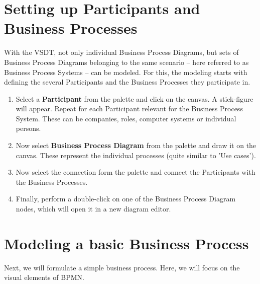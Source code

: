
\section{Setting up Participants and Business Processes}

With the VSDT, not only individual Business Process Diagrams, but sets of Business
Process Diagrams belonging to the same scenario -- here referred to as Business
Process Systems -- can be modeled.  For this, the modeling starts with defining
the several Participants and the Business Processes they participate in.

\begin{enumerate}

	\item Select a \textbf{Participant} from the palette and click on the canvas.
	A stick-figure will appear.  Repeat for each Participant relevant for the
	Business Process System.  These can be companies, roles, computer systems or
	individual persons.
	
	\item Now select \textbf{Business Process Diagram} from the palette and draw
	it on the canvas.  These represent the individual processes (quite similar to
	'Use cases').
	
	\item Now select the connection form the palette and connect the Participants
	with the Business Processes.
	
	\item Finally, perform a double-click on one of the Business Process Diagram
	nodes, which will open it in a new diagram editor.
	
\end{enumerate}



\section{Modeling a basic Business Process}

Next, we will formulate a simple business process.  Here, we will focus on the
visual elements of BPMN.

